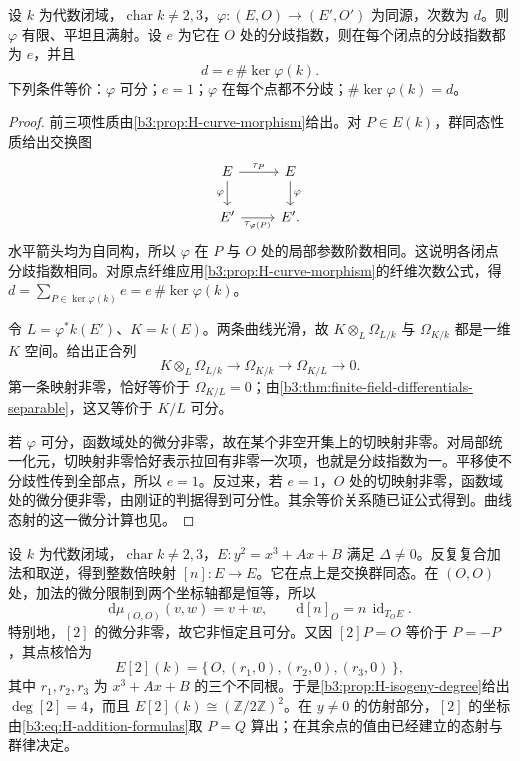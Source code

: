 \begin{proposition}[同源的次数与核]\label{b3:prop:H-isogeny-degree}
	设 \(k\) 为代数闭域，\(\operatorname{char}k\ne2,3\)，\(\varphi:(E,O)\rightarrow(E',O')\) 为同源，次数为 \(d\)。则 \(\varphi\) 有限、平坦且满射。设 \(e\) 为它在 \(O\) 处的分歧指数，则在每个闭点的分歧指数都为 \(e\)，并且
	\[
		d=e\,\#\ker\varphi(k).
	\]
	下列条件等价：\(\varphi\) 可分；\(e=1\)；\(\varphi\) 在每个点都不分歧；\(\#\ker\varphi(k)=d\)。
\end{proposition}
\begin{proof}
	前三项性质由\cref{b3:prop:H-curve-morphism}给出。对 \(P\in E(k)\)，群同态性质给出交换图
	\[
		\begin{tikzcd}
			E \arrow[r,"\tau_P"] \arrow[d,"\varphi"'] & E \arrow[d,"\varphi"] \\
			E' \arrow[r,"\tau_{\varphi(P)}"'] & E' .
		\end{tikzcd}
	\]
	水平箭头均为自同构，所以 \(\varphi\) 在 \(P\) 与 \(O\) 处的局部参数阶数相同。这说明各闭点分歧指数相同。对原点纤维应用\cref{b3:prop:H-curve-morphism}的纤维次数公式，得 \(d=\sum_{P\in\ker\varphi(k)}e=e\,\#\ker\varphi(k)\)。

	令 \(L=\varphi^*k(E')\)、\(K=k(E)\)。两条曲线光滑，故 \(K\otimes_L\Omega_{L/k}\) 与 \(\Omega_{K/k}\) 都是一维 \(K\) 空间。给出正合列
	\[
		K\otimes_L\Omega_{L/k}\longrightarrow\Omega_{K/k}
		\longrightarrow\Omega_{K/L}\longrightarrow0.
	\]
	第一条映射非零，恰好等价于 \(\Omega_{K/L}=0\)；由\cref{b3:thm:finite-field-differentials-separable}，这又等价于 \(K/L\) 可分。

	若 \(\varphi\) 可分，函数域处的微分非零，故在某个非空开集上的切映射非零。对局部统一化元，切映射非零恰好表示拉回有非零一次项，也就是分歧指数为一。平移使不分歧性传到全部点，所以 \(e=1\)。反过来，若 \(e=1\)，\(O\) 处的切映射非零，函数域处的微分便非零，由刚证的判据得到可分性。其余等价关系随已证公式得到。曲线态射的这一微分计算也见\cite[Chapter IV, Propositions 2.1--2.2, pp. 299--300]{Hartshorne1977}。
\end{proof}

\begin{example}[倍点同源]\label{b3:exm:H-doubling-isogeny}
	设 \(k\) 为代数闭域，\(\operatorname{char}k\ne2,3\)，\(E:y^2=x^3+Ax+B\) 满足 \(\Delta\ne0\)。反复复合加法和取逆，得到整数倍映射 \([n]:E\rightarrow E\)。它在点上是交换群同态。在 \((O,O)\) 处，加法的微分限制到两个坐标轴都是恒等，所以
	\[
		\mathrm{d}\mu_{(O,O)}(v,w)=v+w,
		\qquad \mathrm{d}[n]_O=n\,\operatorname{id}_{T_OE}.
	\]
	特别地，\([2]\) 的微分非零，故它非恒定且可分。又因 \([2]P=O\) 等价于 \(P=-P\)，其点核恰为
	\[
		E[2](k)=\{\,O,(r_1,0),(r_2,0),(r_3,0)\,\},
	\]
	其中 \(r_1,r_2,r_3\) 为 \(x^3+Ax+B\) 的三个不同根。于是\cref{b3:prop:H-isogeny-degree}给出 \(\deg[2]=4\)，而且 \(E[2](k)\cong(\mathbb Z/2\mathbb Z)^2\)。在 \(y\ne0\) 的仿射部分，\([2]\) 的坐标由\eqref{b3:eq:H-addition-formulas}取 \(P=Q\) 算出；在其余点的值由已经建立的态射与群律决定。
\end{example}

